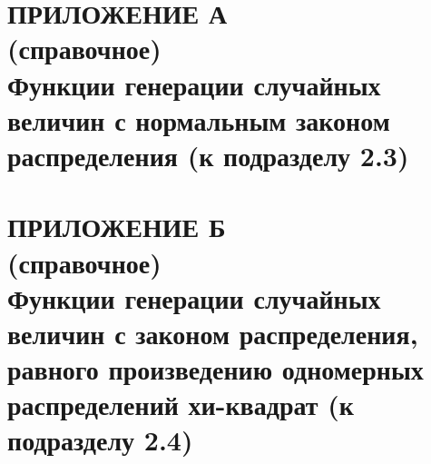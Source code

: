 \renewcommand{\thefigure}{\Asbuk{section}.\arabic{figure}}
\renewcommand{\thetable}{\Asbuk{section}.\arabic{table}}
\renewcommand{\thelstlisting}{\Asbuk{section}.\arabic{lstlisting}}

\pagestyle{fancy}
\fancyhf{} %
\fancyfoot[R]{\thepage}
\renewcommand{\headrulewidth}{0pt}
\renewcommand{\footrulewidth}{0pt}

\setlength{\headheight}{10mm}
\setlength{\headsep}{\baselineskip}

\section*{ПРИЛОЖЕНИЕ А\\(справочное)\\Функции генерации
  случайных величин с нормальным законом распределения
  (к подразделу 2.3)}

\thispagestyle{plain}
\setcounter{section}{1}
\setcounter{figure}{0}
\setcounter{table}{0}
\setcounter{lstlisting}{0}





\setlength{\headheight}{10mm}
\setlength{\headsep}{\baselineskip}
\section*{ПРИЛОЖЕНИЕ Б\\(справочное)\\Функции генерации
  случайных величин с законом распределения, равного
  произведению одномерных распределений хи-квадрат
  (к подразделу 2.4)}

\thispagestyle{plain}
\setcounter{section}{2}
\setcounter{figure}{0}
\setcounter{table}{0}
\setcounter{lstlisting}{0}



